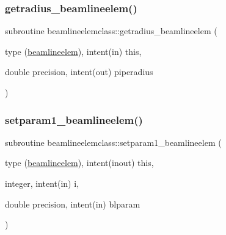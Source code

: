 \mbox{\label{namespacebeamlineelemclass_a1ad4e1512d472a585ab03dee9a2f1acb}} 
\subsubsection{\texorpdfstring{getradius\_beamlineelem()}{getradius\_beamlineelem()}}
{\footnotesize\ttfamily subroutine beamlineelemclass\+::getradius\+\_\+beamlineelem (\begin{DoxyParamCaption}\item[{type (\mbox{\hyperlink{namespacebeamlineelemclass_structbeamlineelemclass_1_1beamlineelem}{beamlineelem}}), intent(in)}]{this,  }\item[{double precision, intent(out)}]{piperadius }\end{DoxyParamCaption})}

\mbox{\label{namespacebeamlineelemclass_a2475c641494686c9c9688a8b15975cbf}} 
\subsubsection{\texorpdfstring{setparam1\_beamlineelem()}{setparam1\_beamlineelem()}}
{\footnotesize\ttfamily subroutine beamlineelemclass\+::setparam1\+\_\+beamlineelem (\begin{DoxyParamCaption}\item[{type (\mbox{\hyperlink{namespacebeamlineelemclass_structbeamlineelemclass_1_1beamlineelem}{beamlineelem}}), intent(inout)}]{this,  }\item[{integer, intent(in)}]{i,  }\item[{double precision, intent(in)}]{blparam }\end{DoxyParamCaption})}

\mbox{\label{namespacebeamlineelemclass_a2ac6f016596ac46cf326e023cbb3f23b}} 
